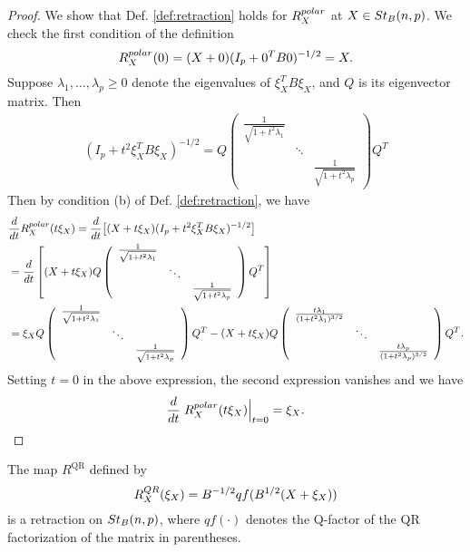 \documentclass[11pt,a4paper]{article}
\begin{document}
\begin{proof}
We show that Def. \ref{def:retraction} holds for $R^{polar}_X$ at $X\in St_B(n,p)$. We check the first condition of the definition
\begin{equation*}
R^{polar}_X(0) = (X+0)(I_p+0^T B 0)^{-1/2} = X.
\end{equation*}
Suppose $\lambda_1,\ldots,\lambda_p\ge 0$ denote the eigenvalues of $\xi_X^TB\xi_X$, and $Q$ is its eigenvector matrix. Then
\begin{align*}
(I_p+t^2\xi_X^TB\xi_X)^{-1/2} = 
Q\left(
\begin{array}{ccc}
\frac{1}{\sqrt{1+t^2\lambda_1}} &  & \\
 & \ddots & \\
 & & \frac{1}{\sqrt{1+t^2\lambda_p}}
\end{array}
\right)Q^T
\end{align*}
Then by condition (b) of Def. \ref{def:retraction}, we have
\begin{align*}
&\dfrac{d}{dt}R^{polar}_X(t\xi_X) = 
\dfrac{d}{dt}\big[(X+t\xi_X)(I_p+t^2\xi_X^TB\xi_X)^{-1/2} \big]\\
&= \dfrac{d}{dt}\left[
(X+t\xi_X)Q\left(
\begin{array}{ccc}
\frac{1}{\sqrt{1+t^2\lambda_1}} &  & \\
 & \ddots & \\
 & & \frac{1}{\sqrt{1+t^2\lambda_p}}
\end{array}
\right)Q^T\right] \\
&= \xi_XQ\left(
\begin{array}{ccc}
\frac{1}{\sqrt{1+t^2\lambda_1}} &  & \\
 & \ddots & \\ 
 & & \frac{1}{\sqrt{1+t^2\lambda_p}}
\end{array}
\right)Q^T - 
(X+t\xi_X)Q\left(
\begin{array}{ccc}
\frac{t\lambda_1}{(1+t^2\lambda_1)^{3/2}} &  & \\
 & \ddots & \\
 & & \frac{t\lambda_p}{(1+t^2\lambda_p)^{3/2}}
\end{array}
\right)Q^T.
\end{align*}
Setting $t = 0$ in the above expression, the second expression vanishes and we have
\begin{equation*}
\dfrac{d}{dt}\left.R^{polar}_X(t\xi_X)\right|_{t=0} = \xi_X.
\end{equation*}
\end{proof}

\begin{prop}
The map $R^{\text{QR}}$ defined by 
\begin{equation}
R^{QR}_X(\xi_X) = B^{-1/2}qf(B^{1/2}(X+\xi_X))
\end{equation}
is a retraction on $St_B(n,p)$, where $qf(\cdot)$ denotes the Q-factor of the QR factorization of the matrix in parentheses.
\end{prop}
\end{document}
